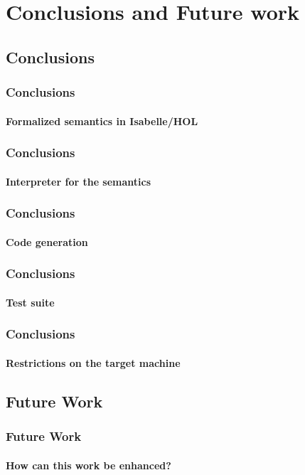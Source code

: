 \section{Conclusions and Future work}


\subsection{Conclusions}


\begin{frame}
\frametitle{Conclusions}
\framesubtitle{Formalized semantics in Isabelle/HOL}


\end{frame}


\begin{frame}
\frametitle{Conclusions}
\framesubtitle{Interpreter for the semantics}


\end{frame}


\begin{frame}
\frametitle{Conclusions}
\framesubtitle{Code generation}


\end{frame}


\begin{frame}
\frametitle{Conclusions}
\framesubtitle{Test suite}


\end{frame}


\begin{frame}
\frametitle{Conclusions}
\framesubtitle{Restrictions on the target machine}


\end{frame}


\subsection{Future Work}


\begin{frame}
\frametitle{Future Work}
\framesubtitle{How can this work be enhanced?}


\end{frame}
